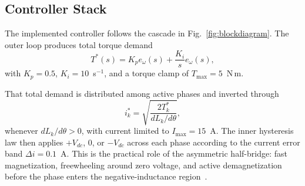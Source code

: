 \documentclass[conference]{IEEEtran}
\begin{document}
\subsection{Controller Stack}
The implemented controller follows the cascade in Fig.~\ref{fig:blockdiagram}.
The outer loop produces total torque demand
\begin{equation}
T^*(s) = K_p e_\omega(s) + \frac{K_i}{s} e_\omega(s),
\label{eq:pi}
\end{equation}
with $K_p=0.5$, $K_i=10$~s$^{-1}$, and a torque clamp of $T_{\max}=5$~N\,m.

That total demand is distributed among active phases and inverted through
\begin{equation}
i_k^* = \sqrt{\frac{2T_k^*}{dL_k/d\theta}},
\label{eq:t2i}
\end{equation}
whenever $dL_k/d\theta > 0$, with current limited to $I_{\max}=15$~A.
The inner hysteresis law then applies $+V_{dc}$, $0$, or $-V_{dc}$ across each phase according to the current error band $\Delta i = 0.1$~A.
This is the practical role of the asymmetric half-bridge: fast magnetization, freewheeling around zero voltage, and active demagnetization before the phase enters the negative-inductance region~\cite{Husain1996}.
\end{document}
